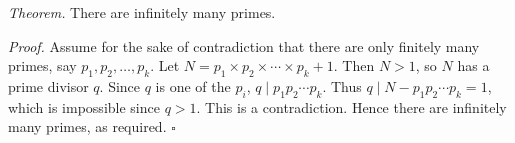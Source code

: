 \textit{Theorem.} There are infinitely many primes.

\textit{Proof.} Assume for the sake of contradiction that there are only finitely many primes, say $p_{1}, p_{2}, \ldots, p_{k}$.
Let $N = p_{1} \times p_{2} \times \cdots \times p_{k} + 1$.
Then $N > 1$, so $N$ has a prime divisor $q$.
Since $q$ is one of the $p_{i}$, $q \mid p_{1} p_{2} \cdots p_{k}$.
Thus $q \mid N - p_{1} p_{2} \cdots p_{k} = 1$, which is impossible since $q > 1$.
This is a contradiction.
Hence there are infinitely many primes, as required. \hfill$\square$